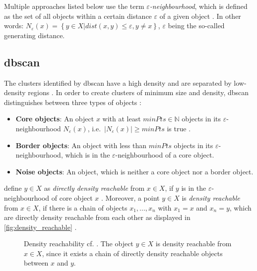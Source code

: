 Multiple approaches listed below use the term \textit{$\varepsilon$-neighbourhood}, which is defined as the set of all objects within a certain distance $\varepsilon$ of a given object \cite{OPTICS2013}.
In other words: $N_\varepsilon (x) = \left\{ y \in X | dist(x,y) \le \varepsilon, y \neq x \right\}$, $\varepsilon$ being the so-called generating distance.


%


\subsection{\acs*{dbscan}}\label{subsec:dbscan}

The clusters identified by \ac{dbscan} have a high density and are separated by low-density regions \cite{OPTICS_kMeans_2016}.
In order to create clusters of minimum size and density, \ac{dbscan} distinguishes between three types of objects \cite{OPTICS_kMeans_2016}:

\begin{itemize}
    \item \textbf{Core objects}: 
    An object $x$ with at least $minPts \in \mathbb{N}$ objects in its $\varepsilon$-neighbourhood $N_\varepsilon(x)$, i.e.\ $| N_\varepsilon (x) | \geq minPts$ is true \cite{OPTICS2013}.

    \item \textbf{Border objects}: 
    An object with less than $minPts$ objects in its $\varepsilon$-neighbourhood, which is in the $\varepsilon$-neighbourhood of a core object.

    \item \textbf{Noise objects}: 
    An object, which is neither a core object nor a border object.
\end{itemize}

\citeauthor{OPTICS_kMeans_2016} define $y \in X$ as \textit{directly density reachable} from $x \in X$, if $y$ is in the $\varepsilon$-neighbourhood of core object $x$ \cite{OPTICS_kMeans_2016}.
Moreover, a point $y \in X$ is \textit{density reachable} from $x \in X$, if there is a chain of objects $x_1, ..., x_n$ with $x_1 = x$ and $x_n = y$, 
which are directly density reachable from each other as displayed in \autoref{fig:density_reachable} \cite{OPTICS_kMeans_2016}.

\begin{figure}[!htp] %
    \centering
    
    \caption[Density reachability]{Density reachability cf. \cite{OPTICS1999}.
    The object $y \in X$ is density reachable from $x \in X$, since it exists a chain of directly density reachable objects between $x$ and $y$.
    }
    \label{fig:density_reachable}
\end{figure}

